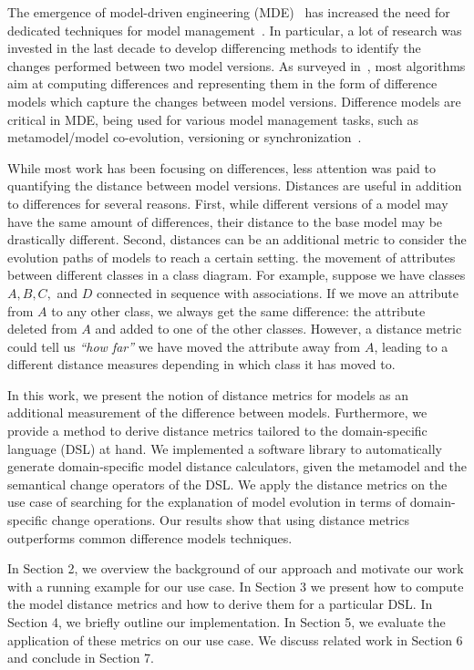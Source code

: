 
The emergence of model-driven engineering (MDE)~\cite{Schmidt2006a} has increased the need for dedicated techniques for model management~\cite{Kolovos2013a}.
In particular, a lot of research was invested in the last decade to develop differencing methods to identify the changes performed between two model versions.
As surveyed in~\cite{StephanC13}, most algorithms aim at computing differences and representing them in the form of difference models which capture the changes between model versions.
Difference models are critical in MDE, being used for various model management tasks, such as metamodel/model co-evolution, versioning or synchronization~\cite{Ruscio2012,Demuth2016}.

While most work has been focusing on differences, less attention was paid to quantifying the distance between model versions.
Distances are useful in addition to differences for several reasons.
First, while different versions of a model may have the same amount of differences, their distance to the base model may be drastically different.
Second, distances can be an additional metric to consider the evolution paths of models to reach a certain setting.
the movement of attributes between different classes in a class diagram.
For example, suppose we have classes $A,B,C,$ and $D$ connected in sequence with associations.
If we move an attribute from $A$ to any other class, we always get the same difference: the attribute deleted from $A$ and added to one of the other classes. However, a distance metric could tell us \textit{``how far''} we have moved the attribute away from $A$, leading to a different distance measures depending in which class it has moved to.

In this work, we present the notion of distance metrics for models as an additional measurement of the difference between models.
Furthermore, we provide a method to derive distance metrics tailored to the domain-specific language (DSL) at hand.
We implemented a software library to automatically generate domain-specific model distance calculators, given the metamodel and the semantical change operators of the DSL.
We apply the distance metrics on the use case of searching for the explanation of model evolution in terms of domain-specific change operations.
Our results show that using distance metrics outperforms common difference models techniques.

In Section 2, we overview the background of our approach and motivate our work with a running example for our use case.
In Section 3 we present how to compute the model distance metrics and how to derive them for a particular DSL.
In Section 4, we briefly outline our implementation.
In Section 5, we evaluate the application of these metrics on our use case.
We discuss related work in Section 6 and conclude in Section 7.